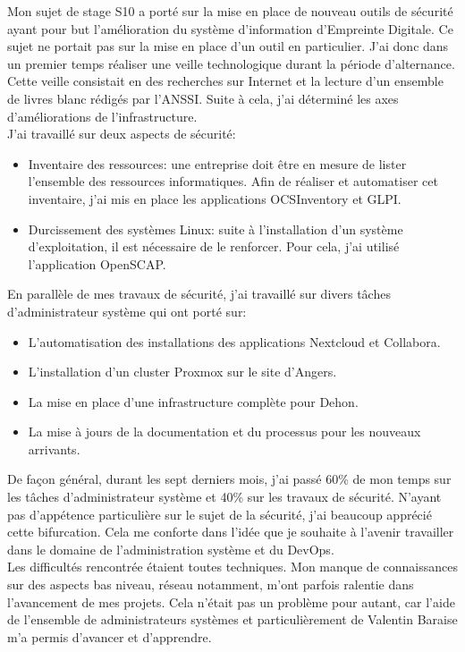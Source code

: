 \documentclass[12pt, a4paper, twoside]{article}
\begin{document}
Mon sujet de stage S10 a porté sur la mise en place de nouveau outils de sécurité ayant pour but l'amélioration du système d'information d'Empreinte Digitale.
Ce sujet ne portait pas sur la mise en place d'un outil en particulier.
J'ai donc dans un premier temps réaliser une veille technologique durant la période d'alternance.
Cette veille consistait en des recherches sur Internet et la lecture d'un ensemble de livres blanc rédigés par l'\gls{ANSSI}.
Suite à cela, j'ai déterminé les axes d'améliorations de l'infrastructure. \\

J'ai travaillé sur deux aspects de sécurité: 
\begin{itemize}
    \item Inventaire des ressources: une entreprise doit être en mesure de lister l'ensemble des ressources informatiques.
    Afin de réaliser et automatiser cet inventaire, j'ai mis en place les applications \gls{OCSInventory} et \gls{GLPI}.
    \item Durcissement des systèmes \gls{Linux}: suite à l'installation d'un système d'exploitation, il est nécessaire de le renforcer.
    Pour cela, j'ai utilisé l'application \gls{OpenSCAP}.
\end{itemize} 

En parallèle de mes travaux de sécurité, j'ai travaillé sur divers tâches d'administrateur système qui ont porté sur:
\begin{itemize}
    \item L'automatisation des installations des applications \gls{Nextcloud} et \gls{Collabora}.
    \item L'installation d'un cluster \gls{Proxmox} sur le site d'Angers.
    \item La mise en place d'une infrastructure complète pour Dehon.
    \item La mise à jours de la documentation et du processus pour les nouveaux arrivants.
\end{itemize} 

De façon général, durant les sept derniers mois, j'ai passé 60\% de mon temps sur les tâches d'administrateur système et 40\% sur les travaux de sécurité.
N'ayant pas d'appétence particulière sur le sujet de la sécurité, j'ai beaucoup apprécié cette bifurcation.
Cela me conforte dans l'idée que je souhaite à l'avenir travailler dans le domaine de l'administration système et du \gls{DevOps}.\\

Les difficultés rencontrée étaient toutes techniques.
Mon manque de connaissances sur des aspects bas niveau, réseau notamment, m'ont parfois ralentie dans l'avancement de mes projets.
Cela n'était pas un problème pour autant, car l'aide de l'ensemble de administrateurs systèmes et particulièrement de Valentin Baraise m'a permis d'avancer et d'apprendre.
\end{document}
